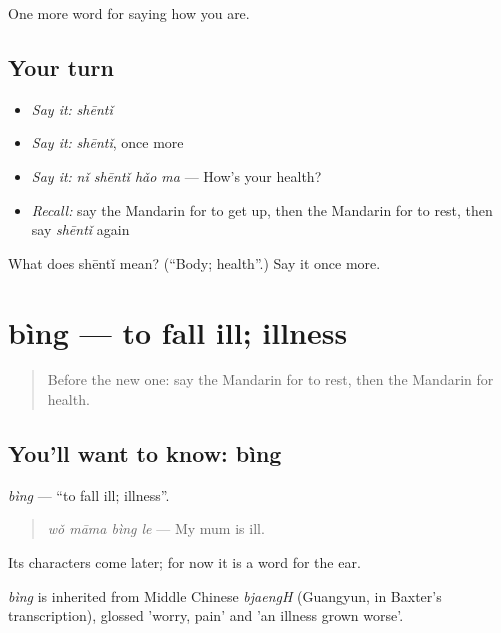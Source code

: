 \begin{grammarlens}[title={What you've built}]
One more word for saying how you are.
\end{grammarlens}

\subsection*{Your turn}
\begin{itemize}
\raggedright
  \item \emph{Say it:} \emph{shēntǐ}
  \item \emph{Say it:} \emph{shēntǐ}, once more
  \item \emph{Say it:} \emph{nǐ shēntǐ hǎo ma} — How's your health?
  \item \emph{Recall:} say the Mandarin for to get up, then the Mandarin for to rest, then say \emph{shēntǐ} again
\end{itemize}

\begin{tcolorbox}[breakable,colback=teal!4,colframe=teal!35!black,title={Before you move on}]
What does shēntǐ mean? (\textquotedblleft{}Body; health\textquotedblright{}.) Say it once more.
\end{tcolorbox}
\section[bìng]{bìng — to fall ill; illness}

\label{lesson:ZH-C50-bing}



\begin{quote}
Before the new one: say the Mandarin for to rest, then the Mandarin for health.
\end{quote}

\subsection*{You'll want to know: bìng}
\emph{bìng} — \textquotedblleft{}to fall ill; illness\textquotedblright{}.

\begin{quote}
\emph{wǒ māma bìng le} — My mum is ill.
\end{quote}

Its characters come later; for now it is a word for the ear.

\begin{cousinweb}
\emph{bìng} is inherited from Middle Chinese \emph{bjaengH} (Guangyun, in Baxter's transcription), glossed 'worry, pain' and 'an illness grown worse'.
\end{cousinweb}

